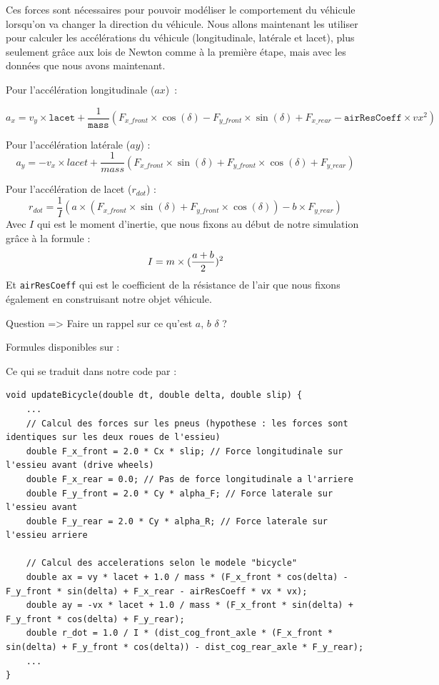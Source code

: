 Ces forces sont nécessaires pour pouvoir modéliser le comportement du véhicule lorsqu'on va changer la direction du véhicule. Nous allons maintenant les utiliser pour calculer les accélérations du véhicule (longitudinale, latérale et lacet), plus seulement grâce aux lois de Newton comme à la première étape, mais avec les données que nous avons maintenant.

Pour l'accélération longitudinale ($ax$) :


$$a_x = v_y \times \texttt{lacet} + \frac{1}{\texttt{mass}}(F_{x\_front} \times \cos(\delta) - F_{y\_front} \times \sin(\delta) + F_{x\_rear} - \texttt{airResCoeff} \times vx^2)$$

Pour l'accélération latérale ($ay$) :
$$a_y=-v_x\times lacet + \frac{1}{mass}(F_{x\_front} \times \sin(\delta) + F_{y\_front} \times \cos(\delta) + F_{y\_rear})$$

Pour l'accélération de lacet ($r_{dot}$) :
$$r_{dot} = \frac{1}{I}(a \times (F_{x\_front} \times \sin(\delta) + F_{y\_front} \times \cos(\delta)) - b \times F_{y\_rear})$$
Avec $I$ qui est le moment d'inertie, que nous fixons au début de notre simulation grâce à la formule : $$I = m \times ({{a+b}\over{2}})^2$$
Et \texttt{airResCoeff} qui est le coefficient de la résistance de l'air que nous fixons également en construisant notre objet véhicule. \newline

{\Large Question => Faire un rappel sur ce qu'est $a$, $b$ $\delta$ ?}
\begin{center}
Formules disponibles sur : \cite{VDS_MathWorks}
\end{center}


Ce qui se traduit dans notre code par :

\begin{lstlisting}[style=CStyle]
void updateBicycle(double dt, double delta, double slip) {
    ...
    // Calcul des forces sur les pneus (hypothese : les forces sont identiques sur les deux roues de l'essieu)
    double F_x_front = 2.0 * Cx * slip; // Force longitudinale sur l'essieu avant (drive wheels)
    double F_x_rear = 0.0; // Pas de force longitudinale a l'arriere
    double F_y_front = 2.0 * Cy * alpha_F; // Force laterale sur l'essieu avant
    double F_y_rear = 2.0 * Cy * alpha_R; // Force laterale sur l'essieu arriere

    // Calcul des accelerations selon le modele "bicycle"
    double ax = vy * lacet + 1.0 / mass * (F_x_front * cos(delta) - F_y_front * sin(delta) + F_x_rear - airResCoeff * vx * vx);
    double ay = -vx * lacet + 1.0 / mass * (F_x_front * sin(delta) + F_y_front * cos(delta) + F_y_rear);
    double r_dot = 1.0 / I * (dist_cog_front_axle * (F_x_front * sin(delta) + F_y_front * cos(delta)) - dist_cog_rear_axle * F_y_rear);
    ...
}
\end{lstlisting}


